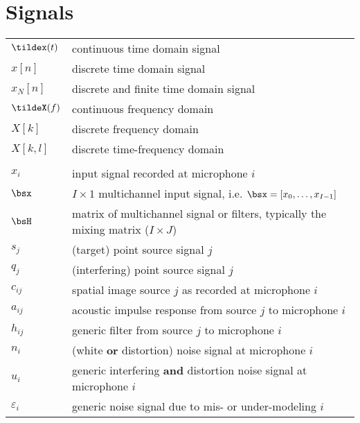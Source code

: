 \section*{Signals}
\begin{table}[H]
    \begin{tabular}{ll}
        $\tildex(t)$    & continuous time domain signal\\
        $x[n]$          & discrete time domain signal\\
        $x_N[n]$          & discrete and finite time domain signal\\
        $\tildeX(f)$    & continuous frequency domain\\
        $X[k]$          & discrete frequency domain\\
        $X[k,l]$        & discrete time-frequency domain\\
                        &                     \\
        $x_i$     & input signal recorded at microphone $i$\\
        $\bsx$    & $I \times 1$ multichannel input signal, i.e. $\bsx = [x_0, \ldots, x_{I-1}]$ \\
        $\bsH$    & matrix of multichannel signal or filters, typically the mixing matrix ($I \times J$)\\
        $s_j$     & (target) point source signal $j$ \\
        $q_j$     & (interfering) point source signal $j$ \\
        $c_{ij}$  & spatial image source $j$ as recorded at microphone $i$\\
        $a_{ij}$  & acoustic impulse response from source $j$ to microphone $i$ \\
        $h_{ij}$  & generic filter from source $j$ to microphone $i$ \\
        $n_{i}$   & (white \textbf{or} distortion) noise signal at microphone $i$\\
        $u_{i}$   & generic interfering \textbf{and} distortion noise signal at microphone $i$ \\
        $\varepsilon_{i}$   & generic noise signal due to mis- or under-modeling $i$ \\
    \end{tabular}
\end{table}

